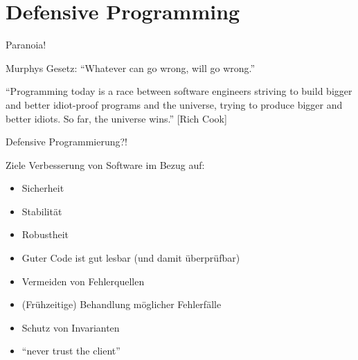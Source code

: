\section{Defensive Programming}
\begin{frame}{Paranoia!}
	\begin{itemize}
	\end{itemize}
\end{frame}

\begin{frame}{Defensive Programmierung?!}	
	\begin{block}{Ziele}
		Verbesserung von Software im Bezug auf:
		\begin{itemize}
			\item Sicherheit
			\item Stabilität
			\item Robustheit
		\end{itemize}
	\end{block}
	
	\begin{itemize}
		\item Guter Code ist gut lesbar (und damit überprüfbar)
		\item Vermeiden von Fehlerquellen
		\item (Frühzeitige) Behandlung möglicher Fehlerfälle
		\item Schutz von Invarianten
		\item \enquote{never trust the client}
	\end{itemize}
\end{frame}

